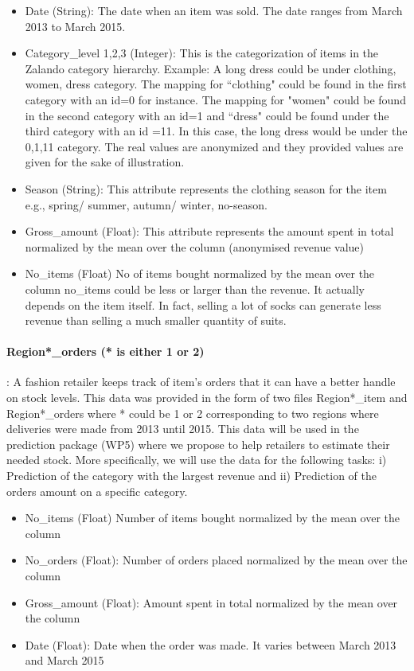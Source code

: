 \begin{itemize}
    \item Date (String): The date when an item was sold. The date ranges from March 2013 to March 2015.
    \item Category\_level 1,2,3 (Integer): This is the categorization of items in the Zalando category hierarchy. Example: A long dress could be under clothing, women, dress category. The mapping for ``clothing" could be found in the first category with an id=0 for instance. The mapping for "women" could be found in the second category with an id=1 and ``dress" could be found under the third category with an id =11. In this case, the long dress would be under the 0,1,11 category. The real values are anonymized and they provided values are given for the sake of illustration. \item Season (String): This attribute represents the clothing season for the item e.g., spring/ summer, autumn/ winter, no-season.
    \item Gross\_amount (Float): This attribute represents the amount spent in total normalized by the mean over the column (anonymised revenue value)
    \item No\_items (Float) No of items bought normalized by the mean over the column no\_items could be less or larger than the revenue. It actually depends on the item itself. In fact, selling a lot of socks can generate less revenue than selling a much smaller quantity of suits.
\end{itemize}

\paragraph*{Region*\_orders (* is either  1 or 2)}: A fashion retailer keeps track of item’s orders that it can have a better handle on stock levels. This data was provided in the form of two files Region*\_item and Region*\_orders where * could be 1 or 2 corresponding to two regions where deliveries were made from 2013 until 2015. This data will be used in the prediction package (WP5) where we propose to help retailers to estimate their needed stock. More specifically, we will use the data for the following tasks: i) Prediction of the category with the largest revenue and ii) Prediction of the orders amount on a specific category.

\begin{itemize}
    \item No\_items (Float) Number of items bought normalized by the mean over the column
    \item No\_orders (Float): Number of orders placed normalized by the mean over the column
    \item Gross\_amount (Float): Amount spent in total normalized by the mean over the column
    \item Date (Float):  Date when the order was made. It varies between March 2013 and March 2015
\end{itemize}

